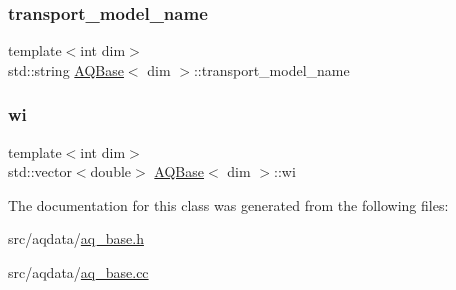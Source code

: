 \subsubsection{\texorpdfstring{transport\+\_\+model\+\_\+name}{transport\_model\_name}}
{\footnotesize\ttfamily template$<$int dim$>$ \\
std\+::string \hyperlink{class_a_q_base}{A\+Q\+Base}$<$ dim $>$\+::transport\+\_\+model\+\_\+name\hspace{0.3cm}{\ttfamily [protected]}}

\mbox{\label{class_a_q_base_aa43b0232837b86e608da7507bd9a14b5}} 
\subsubsection{\texorpdfstring{wi}{wi}}
{\footnotesize\ttfamily template$<$int dim$>$ \\
std\+::vector$<$double$>$ \hyperlink{class_a_q_base}{A\+Q\+Base}$<$ dim $>$\+::wi\hspace{0.3cm}{\ttfamily [protected]}}



The documentation for this class was generated from the following files\+:\begin{DoxyCompactItemize}
\item 
src/aqdata/\hyperlink{aq__base_8h}{aq\+\_\+base.\+h}\item 
src/aqdata/\hyperlink{aq__base_8cc}{aq\+\_\+base.\+cc}\end{DoxyCompactItemize}
